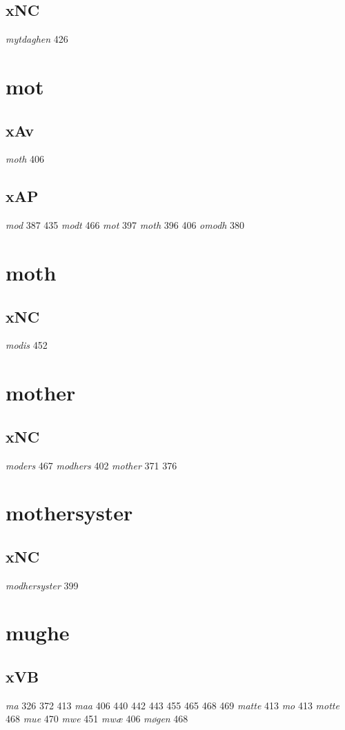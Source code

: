 \documentclass[a4paper,twocolumn]{article}
\begin{document}
\subsection{xNC}
\label{sec:org1c98bcf}
\emph{mytdaghen} 426 
\section{mot}
\label{sec:orgb146a16}
\subsection{xAv}
\label{sec:org9db31fb}
\emph{moth} 406 
\subsection{xAP}
\label{sec:org68c6a55}
\emph{mod} 387 435 \emph{modt} 466 \emph{mot} 397 \emph{moth} 396 406 \emph{omodh} 380 
\section{moth}
\label{sec:orgddc5126}
\subsection{xNC}
\label{sec:org156c0b7}
\emph{modis} 452 
\section{mother}
\label{sec:org54b074a}
\subsection{xNC}
\label{sec:org6518944}
\emph{moders} 467 \emph{modhers} 402 \emph{mother} 371 376 
\section{mothersyster}
\label{sec:org60b5052}
\subsection{xNC}
\label{sec:org54b0445}
\emph{modhersyster} 399 
\section{mughe}
\label{sec:org6ecfb80}
\subsection{xVB}
\label{sec:org9af1b0f}
\emph{ma} 326 372 413 \emph{maa} 406 440 442 443 455 465 468 469 \emph{matte} 413 \emph{mo} 413 \emph{motte} 468 \emph{mue} 470 \emph{mwe} 451 \emph{mwæ} 406 \emph{møgen} 468 
\end{document}
